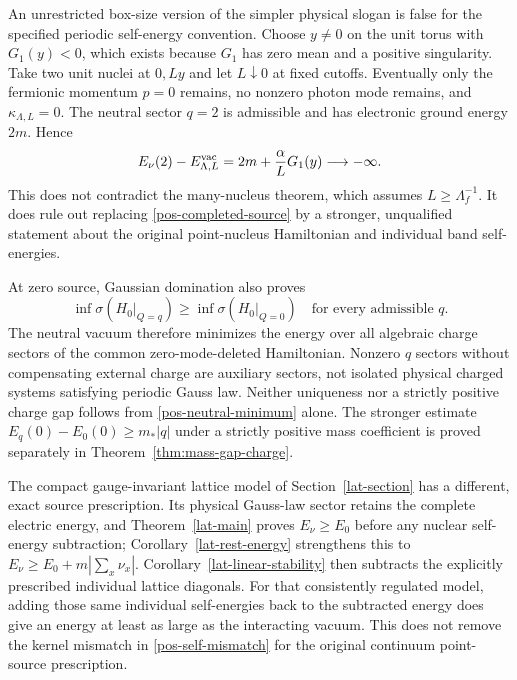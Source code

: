 An unrestricted box-size version of the simpler physical slogan is
false for the specified periodic self-energy convention.  Choose
$y\ne0$ on the unit torus with $G_1(y)<0$, which exists because
$G_1$ has zero mean and a positive singularity.  Take two unit nuclei
at $0,Ly$ and let $L\downarrow0$ at fixed cutoffs.  Eventually only the
fermionic momentum $p=0$ remains, no nonzero photon mode remains, and
$\kappa_{\Lambda,L}=0$.  The neutral sector $q=2$ is admissible and
has electronic ground energy $2m$.  Hence
\begin{equation}
 E_\nu(2)-E^{\rm vac}_{\Lambda,L}
 =2m+\frac\alpha L G_1(y)\longrightarrow-\infty.
 \label{pos-small-box}
\end{equation}
This does not contradict the many-nucleus theorem, which assumes
$L\geq\Lambda_f^{-1}$.  It does rule out replacing
\eqref{pos-completed-source} by a stronger, unqualified statement about
the original point-nucleus Hamiltonian and individual band self-energies.

At zero source, Gaussian domination also proves
\begin{equation}
 \inf\sigma(H_0|_{Q=q})\geq
 \inf\sigma(H_0|_{Q=0})
 \quad\text{for every admissible }q.
 \label{pos-neutral-minimum}
\end{equation}
The neutral vacuum therefore minimizes the energy over all algebraic
charge sectors of the common zero-mode-deleted Hamiltonian.  Nonzero
$q$ sectors without compensating external charge are auxiliary sectors,
not isolated physical charged systems satisfying periodic Gauss law.
Neither uniqueness nor a strictly positive charge gap follows from
\eqref{pos-neutral-minimum} alone.  The stronger estimate
$E_q(0)-E_0(0)\geq m_*|q|$ under a strictly positive mass coefficient
is proved separately in Theorem~\ref{thm:mass-gap-charge}.

The compact gauge-invariant lattice model of Section~\ref{lat-section}
has a different, exact source prescription.  Its physical Gauss-law
sector retains the complete electric energy, and
Theorem~\ref{lat-main} proves $E_\nu\geq E_0$ before any nuclear
self-energy subtraction; Corollary~\ref{lat-rest-energy} strengthens
this to $E_\nu\geq E_0+m|\sum_x\nu_x|$.
Corollary~\ref{lat-linear-stability} then
subtracts the explicitly prescribed individual lattice diagonals.
For that consistently regulated model, adding those same individual
self-energies back to the subtracted energy does give an energy at
least as large as the interacting vacuum.  This does not remove the
kernel mismatch in \eqref{pos-self-mismatch} for the original
continuum point-source prescription.

